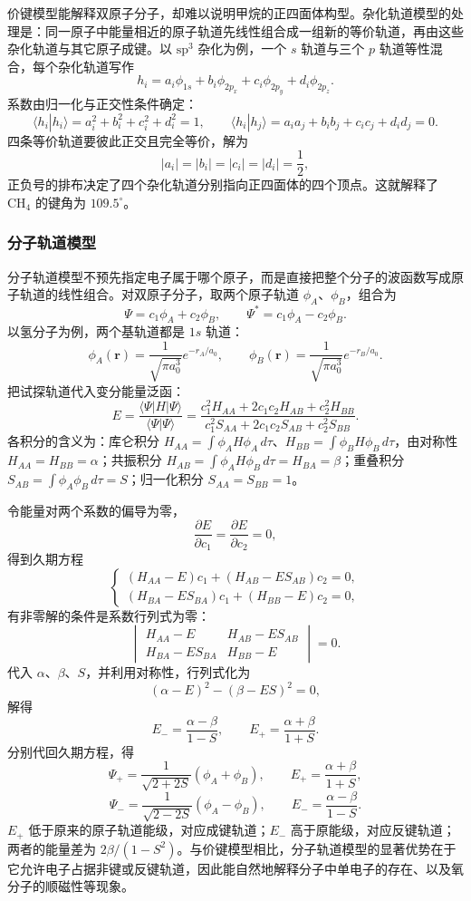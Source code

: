 \documentclass[UTF8]{ctexbook}
\begin{document}
价键模型能解释双原子分子，却难以说明甲烷的正四面体构型。杂化轨道模型的处理是：同一原子中能量相近的原子轨道先线性组合成一组新的等价轨道，再由这些杂化轨道与其它原子成键。以 $\mathrm{sp^3}$ 杂化为例，一个 $s$ 轨道与三个 $p$ 轨道等性混合，每个杂化轨道写作
\[
h_i=a_i\phi_{1s}+b_i\phi_{2p_x}+c_i\phi_{2p_y}+d_i\phi_{2p_z}.
\]
系数由归一化与正交性条件确定：
\[
\langle h_i|h_i\rangle=a_i^2+b_i^2+c_i^2+d_i^2=1,
\qquad
\langle h_i|h_j\rangle=a_ia_j+b_ib_j+c_ic_j+d_id_j=0 .
\]
四条等价轨道要彼此正交且完全等价，解为
\[
|a_i|=|b_i|=|c_i|=|d_i|=\frac{1}{2},
\]
正负号的排布决定了四个杂化轨道分别指向正四面体的四个顶点。这就解释了 $\mathrm{CH_4}$ 的键角为 $109.5^\circ$。

\subsubsection{分子轨道模型}

分子轨道模型不预先指定电子属于哪个原子，而是直接把整个分子的波函数写成原子轨道的线性组合。对双原子分子，取两个原子轨道 $\phi_A$、$\phi_B$，组合为
\[
\Psi=c_1\phi_A+c_2\phi_B,\qquad
\Psi^*=c_1\phi_A-c_2\phi_B .
\]
以氢分子为例，两个基轨道都是 $1s$ 轨道：
\[
\phi_A(\mathbf{r})=\frac{1}{\sqrt{\pi a_0^3}}e^{-r_A/a_0},
\qquad
\phi_B(\mathbf{r})=\frac{1}{\sqrt{\pi a_0^3}}e^{-r_B/a_0}.
\]
把试探轨道代入变分能量泛函：
\[
E=\frac{\langle\Psi|H|\Psi\rangle}{\langle\Psi|\Psi\rangle}
=\frac{c_1^2H_{AA}+2c_1c_2H_{AB}+c_2^2H_{BB}}
{c_1^2S_{AA}+2c_1c_2S_{AB}+c_2^2S_{BB}}.
\]
各积分的含义为：库仑积分 $H_{AA}=\int\phi_AH\phi_A\,d\tau$、$H_{BB}=\int\phi_BH\phi_B\,d\tau$，由对称性 $H_{AA}=H_{BB}=\alpha$；共振积分 $H_{AB}=\int\phi_AH\phi_B\,d\tau=H_{BA}=\beta$；重叠积分 $S_{AB}=\int\phi_A\phi_B\,d\tau=S$；归一化积分 $S_{AA}=S_{BB}=1$。

令能量对两个系数的偏导为零，
\[
\frac{\partial E}{\partial c_1}=\frac{\partial E}{\partial c_2}=0,
\]
得到久期方程
\[
\begin{cases}
(H_{AA}-E)c_1+(H_{AB}-ES_{AB})c_2=0,\\
(H_{BA}-ES_{BA})c_1+(H_{BB}-E)c_2=0,
\end{cases}
\]
有非零解的条件是系数行列式为零：
\[
\begin{vmatrix}
H_{AA}-E & H_{AB}-ES_{AB}\\
H_{BA}-ES_{BA} & H_{BB}-E
\end{vmatrix}=0 .
\]
代入 $\alpha$、$\beta$、$S$，并利用对称性，行列式化为
\[
(\alpha-E)^2-(\beta-ES)^2=0,
\]
解得
\[
E_-=\frac{\alpha-\beta}{1-S},\qquad
E_+=\frac{\alpha+\beta}{1+S}.
\]
分别代回久期方程，得
\[
\Psi_+=\frac{1}{\sqrt{2+2S}}\left(\phi_A+\phi_B\right),
\qquad E_+=\frac{\alpha+\beta}{1+S},
\]
\[
\Psi_-=\frac{1}{\sqrt{2-2S}}\left(\phi_A-\phi_B\right),
\qquad E_-=\frac{\alpha-\beta}{1-S}.
\]
$E_+$ 低于原来的原子轨道能级，对应成键轨道；$E_-$ 高于原能级，对应反键轨道；两者的能量差为 $2\beta/(1-S^2)$。与价键模型相比，分子轨道模型的显著优势在于它允许电子占据非键或反键轨道，因此能自然地解释分子中单电子的存在、以及氧分子的顺磁性等现象。
\end{document}
